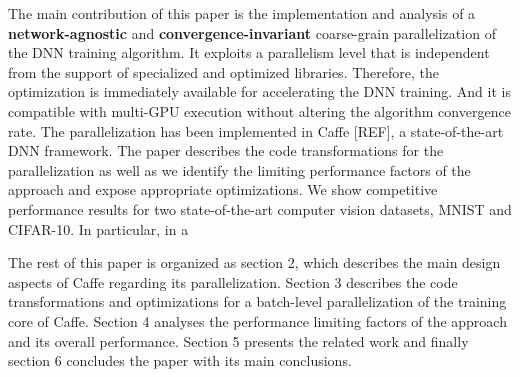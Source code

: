 The main contribution of this paper is the implementation and
analysis of a \textbf{network-agnostic} and \textbf{convergence-invariant} 
coarse-grain parallelization of the DNN training algorithm.
It exploits a parallelism level that is independent from the
support of specialized and optimized libraries. Therefore, the
optimization is immediately available for accelerating the DNN
training. And it is compatible with multi-GPU execution without 
altering the algorithm convergence rate. The parallelization has 
been implemented in Caffe [REF], a state-of-the-art DNN framework. 
The paper describes the code transformations for the parallelization 
as well as we identify the limiting performance factors of the
approach and expose appropriate optimizations. We show competitive 
performance results for two state-of-the-art computer vision
datasets, MNIST and CIFAR-10. In particular, in a 

The rest of this paper is organized as section 2, which 
describes the main design aspects of Caffe regarding its 
parallelization. Section 3 describes the code transformations 
and optimizations for a batch-level parallelization of the 
training core of Caffe. Section 4 analyses the performance 
limiting factors of the approach and its overall performance. 
Section 5 presents the related work and finally section 6 
concludes the paper with its main conclusions.

